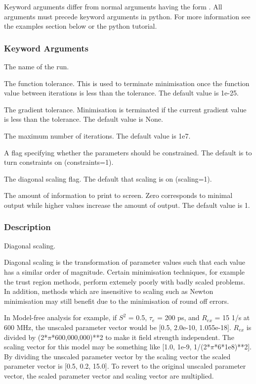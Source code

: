 Keyword arguments differ from normal arguments having the form 
.  All
arguments must precede keyword arguments in python.   For more information see the examples
section below or the python  tutorial.


\subsubsection{Keyword Arguments}


  The name of the run.

  The function tolerance.  This is used to terminate minimisation  once the function value between iterations is less than the tolerance.  The default value is 1e-25.

  The gradient tolerance.  Minimisation  is terminated if the current gradient value is less than the tolerance.  The default value is None.

  The maximum number of iterations.  The default value is 1e7.

  A flag specifying whether the parameters should be constrained.  The default is to turn constraints  on (constraints=1).

  The diagonal scaling flag.  The default that scaling is on (scaling=1).


  The amount of information to print to screen.  Zero corresponds to minimal output while higher values increase the amount of output.  The default value is 1.

\subsubsection{Description}

Diagonal scaling.

Diagonal scaling is the transformation of parameter values such that each value has a
similar order of magnitude.  Certain minimisation  techniques, for example the trust region
methods, perform extemely poorly with badly scaled problems.  In addition, methods which are
insensitive to scaling such as Newton  minimisation  may still benefit due to the minimisation 
of round off errors.

In Model-free analysis for example, if $S^2$ = 0.5, $\tau_e$ = 200 ps, and $R_{ex}$ = 15 1/s at 600 MHz,
the unscaled parameter vector would be [0.5, 2.0e-10, 1.055e-18].  $R_{ex}$ is divided by
(2*$\pi$*600,000,000)**2 to make it field strength independent.  The scaling vector for this
model may be something like [1.0, 1e-9, 1/(2*$\pi$*6*1e8)**2].  By dividing the unscaled
parameter vector by the scaling vector the scaled parameter vector is [0.5, 0.2, 15.0].  To
revert to the original unscaled parameter vector, the scaled parameter vector and scaling
vector are multiplied.


